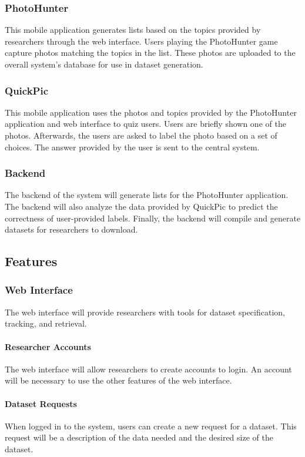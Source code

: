 \documentclass{article}
\begin{document}
\subsubsection{PhotoHunter}
This mobile application generates lists based on the topics provided by
researchers through the web interface. Users playing the PhotoHunter game
capture photos matching the topics in the list. These photos are uploaded to
the overall system's database for use in dataset generation.

\subsubsection{QuickPic}
This mobile application uses the photos and topics provided by the PhotoHunter
application and web interface to quiz users. Users are briefly shown one of the
photos. Afterwards, the users are asked to label the photo based on a set of
choices. The answer provided by the user is sent to the central system.

\subsubsection{Backend}
The backend of the system will generate lists for the PhotoHunter application.
The backend will also analyze the data provided by QuickPic to predict the
correctness of user-provided labels. Finally, the backend will compile and
generate datasets for researchers to download.

\subsection{Features}

\subsubsection{Web Interface}
The web interface will provide researchers with tools for dataset
specification, tracking, and retrieval.

  \paragraph{Researcher Accounts}
  The web interface will allow researchers to create accounts to login. An
  account will be necessary to use the other features of the web interface.

  \paragraph{Dataset Requests}
  When logged in to the system, users can create a new request for a dataset.
  This request will be a description of the data needed and the desired size of
  the dataset.
\end{document}
